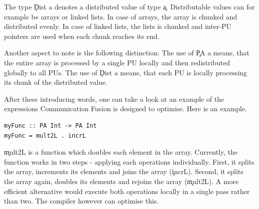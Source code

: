     The type \c{Dist a} denotes a distributed value of type \c{a}.
    Distributable values can for example be arrays or linked lists.
    In case of arrays, the array is chunked and distributed evenly.
    In case of linked lists, the lists is chunked and
    inter-PU pointers are used when each chunk reaches its end.
    
    Another aspect to note is the following distinction:
    The use of \c{PA a} means, that the entire array
    is processed by a single PU locally and
    then redistributed globally to all PUs.
    The use of \c{Dist a} means,
    that each PU is locally processing its
    chunk of the distributed value.
    
    After these introducing words, one can take a look at
    an example of the expressions Communication Fusion is designed to optimise. Here is an example.
    \begin{lstlisting}
myFunc :: PA Int -> PA Int
myFunc = mult2L . incrL
    \end{lstlisting}
    \c{mult2L} is a function which doubles each element in the array.
    Currently, the function works in two steps - applying each operations individually.
    First, it splits the array, increments its elements and joins the array
    (\c{incrL}). Second, it splits
    the array again, doubles its elements and rejoins the array
    (\c{mult2L}).
    A more efficient alternative would execute both operations locally
    in a single pass rather than two.
    The compiler however can optimise this.
    
